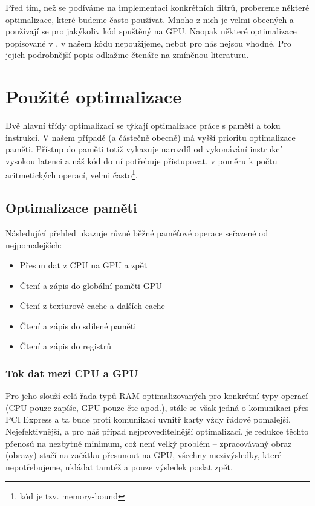 
Před tím, než se podíváme na implementaci konkrétních filtrů, probereme některé optimalizace, které budeme často používat. Mnoho z nich je velmi obecných a používají se pro jakýkoliv kód spuštěný na GPU. Naopak některé optimalizace popisované v \cite{CUDA programming g.}, \cite{CUDA best practices} v našem kódu nepoužijeme, neboť pro nás nejsou vhodné. Pro jejich podrobnější popis odkažme čtenáře na zmíněnou literaturu.

\section{Použité optimalizace}

    Dvě hlavní třídy optimalizací se týkají optimalizace práce s pamětí a toku instrukcí. V našem případě (a částečně obecně) má vyšší prioritu optimalizace paměti. Přístup do paměti totiž vykazuje narozdíl od vykonávání instrukcí vysokou latenci a náš kód do ní potřebuje přistupovat, v poměru k počtu aritmetických operací, velmi často\footnote{kód je tzv. memory-bound}.

    \subsection{Optimalizace paměti}

        Následující přehled ukazuje různé běžné paměťové operace seřazené od nejpomalejších:
    \begin{itemize}
      \item Přesun dat z CPU na GPU a zpět
      \item Čtení a zápis do globální paměti GPU
      \item Čtení z texturové cache a dalších cache
      \item Čtení a zápis do sdílené paměti
      \item Čtení a zápis do registrů
    \end{itemize}

        \subsubsection{Tok dat mezi CPU a GPU}

        Pro jeho slouží celá řada typů RAM optimalizovaných pro konkrétní typy operací (CPU pouze zapíše, GPU pouze čte apod.), stále se však jedná o komunikaci přes PCI Express a ta bude proti komunikaci uvnitř karty vždy řádově pomalejší. Nejefektivnější, a pro náš případ nejproveditelnější optimalizací, je redukce těchto přenosů na nezbytné minimum, což není velký problém -- zpracovávaný obraz (obrazy) stačí na začátku přesunout na GPU, všechny mezivýsledky, které nepotřebujeme, ukládat tamtéž a pouze výsledek poslat zpět.


